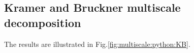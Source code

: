 \begin{figure}[htbp]
 \hfill
 \hfill
 \label{fig:multiscale:python:erodil}%
\end{figure}

\subsection{Kramer and Bruckner multiscale decomposition}
The results are illustrated in Fig.\ref{fig:multiscale:python:KB}.

